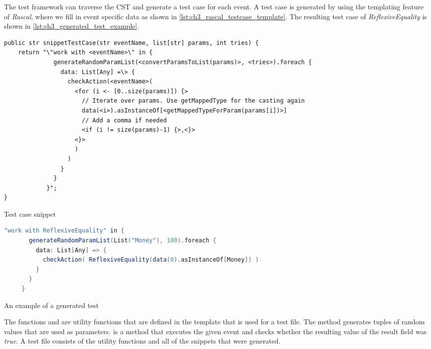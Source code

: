 The test framework can traverse the CST and generate a test case for each
event. A test case is generated by using the templating feature of
\textit{Rascal}, where we fill in event specific data as shown in
\autoref{lst:ch3_rascal_testcase_template}. The resulting test case of
\textit{ReflexiveEquality} is shown in \autoref{lst:ch3_generated_test_example}.
\begin{sourcecode}[!ht]
\begin{lstlisting}[language=Rascal]
public str snippetTestCase(str eventName, list[str] params, int tries) {
	return "\"work with <eventName>\" in {
	          generateRandomParamList(<convertParamsToList(params)>, <tries>).foreach {
	            data: List[Any] =\> {
	              checkAction(<eventName>(
	       	        <for (i <- [0..size(params)]) {>
                      // Iterate over params. Use getMappedType for the casting again
                      data(<i>).asInstanceOf[<getMappedTypeForParam(params[i])>]
                      // Add a comma if needed
                      <if (i != size(params)-1) {>,<}>
                    <}>
	                )
	              )
	            }
	          }
	        }";
}
\end{lstlisting}
\caption{Test case snippet}
\label{lst:ch3_rascal_testcase_template}
\end{sourcecode}
\FloatBarrier\noindent

\begin{sourcecode}[!ht]
\begin{lstlisting}[language=Scala]
    "work with ReflexiveEquality" in {
       generateRandomParamList(List("Money"), 100).foreach {
         data: List[Any] => {
           checkAction( ReflexiveEquality(data(0).asInstanceOf[Money]) )
         }
       }
     }
\end{lstlisting}
\caption{An example of a generated test}
\label{lst:ch3_generated_test_example}
\end{sourcecode}
\FloatBarrier\noindent
The functions  and  are utility
functions that are defined in the template that is used for a test file. The
 method generates tuples of random values that
are used as parameters.  is a method that executes the given
event and checks whether the resulting value of the result field was
\textit{true}. A test file consists of the utility functions and all of the
snippets that were generated.

